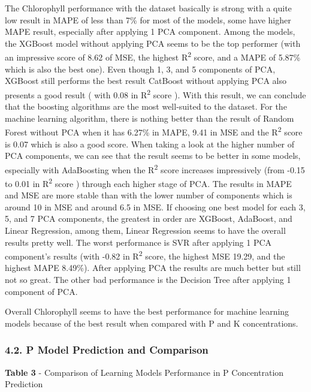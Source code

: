 \documentclass[
]{article}
\begin{document}
The Chlorophyll performance with the dataset basically is strong with a
quite low result in MAPE of less than 7\% for most of the models, some
have higher MAPE result, especially after applying 1 PCA component.
Among the models, the XGBoost model without applying PCA seems to be the
top performer (with an impressive score of 8.62 of MSE, the highest
R\textsuperscript{2} score, and a MAPE of 5.87\% which is also the best
one). Even though 1, 3, and 5 components of PCA, XGBoost still performs
the best result CatBoost without applying PCA also presents a good
result ( with 0.08 in R\textsuperscript{2} score ). With this result, we
can conclude that the boosting algorithms are the most well-suited to
the dataset. For the machine learning algorithm, there is nothing better
than the result of Random Forest without PCA when it has 6.27\% in MAPE,
9.41 in MSE and the R\textsuperscript{2} score is 0.07 which is also a
good score. When taking a look at the higher number of PCA components,
we can see that the result seems to be better in some models, especially
with AdaBoosting when the R\textsuperscript{2} score increases
impressively (from -0.15 to 0.01 in R\textsuperscript{2} score ) through
each higher stage of PCA. The results in MAPE and MSE are more stable
than with the lower number of components which is around 10 in MSE and
around 6.5 in MSE. If choosing one best model for each 3, 5, and 7 PCA
components, the greatest in order are XGBoost, AdaBoost, and Linear
Regression, among them, Linear Regression seems to have the overall
results pretty well. The worst performance is SVR after applying 1 PCA
component's results (with -0.82 in R\textsuperscript{2} score, the
highest MSE 19.29, and the highest MAPE 8.49\%). After applying PCA the
results are much better but still not so great. The other bad
performance is the Decision Tree after applying 1 component of PCA.

Overall Chlorophyll seems to have the best performance for machine
learning models because of the best result when compared with P and K
concentrations.

\hypertarget{p-model-prediction-and-comparison}{%
\subsubsection{\texorpdfstring{\textbf{4.2. P Model Prediction and
Comparison}}{4.2. P Model Prediction and Comparison}}\label{p-model-prediction-and-comparison}}

\textbf{Table 3} - Comparison of Learning Models Performance in P
Concentration Prediction
\end{document}
